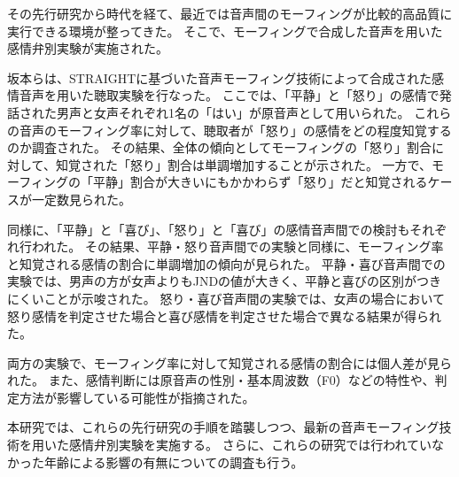 その先行研究\cite{laukka2005categorical}から時代を経て、最近では音声間のモーフィングが比較的高品質に実行できる環境が整ってきた\cite{matsui2003STRAIGHT,kawahara2024interactive}。
そこで、モーフィングで合成した音声を用いた感情弁別実験が実施された。

坂本らは、STRAIGHTに基づいた音声モーフィング技術\cite{matsui2003STRAIGHT}によって合成された感情音声を用いた聴取実験を行なった\cite{sakamoto2020morphEmo}。
ここでは、「平静」と「怒り」の感情で発話された男声と女声それぞれ1名の「はい」が原音声として用いられた。
これらの音声のモーフィング率に対して、聴取者が「怒り」の感情をどの程度知覚するのか調査された。
その結果、全体の傾向としてモーフィングの「怒り」割合に対して、知覚された「怒り」割合は単調増加することが示された。
一方で、モーフィングの「平静」割合が大きいにもかかわらず「怒り」だと知覚されるケースが一定数見られた。

同様に、「平静」と「喜び」、「怒り」と「喜び」の感情音声間での検討もそれぞれ行われた\cite{sakamoto2021morphEmo}。
その結果、平静・怒り音声間での実験と同様に、モーフィング率と知覚される感情の割合に単調増加の傾向が見られた。
平静・喜び音声間での実験では、男声の方が女声よりもJNDの値が大きく、平静と喜びの区別がつきにくいことが示唆された。
怒り・喜び音声間の実験では、女声の場合において怒り感情を判定させた場合と喜び感情を判定させた場合で異なる結果が得られた。

両方の実験で、モーフィング率に対して知覚される感情の割合には個人差が見られた。
また、感情判断には原音声の性別・基本周波数（F0）などの特性や、判定方法が影響している可能性が指摘された。

本研究では、これらの先行研究の手順を踏襲しつつ、最新の音声モーフィング技術\cite{kawahara2024interactive}を用いた感情弁別実験を実施する。
さらに、これらの研究では行われていなかった年齢による影響の有無についての調査も行う。







